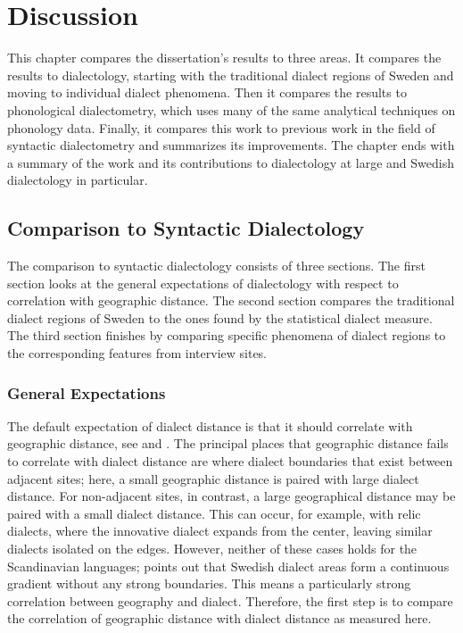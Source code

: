 \chapter{Discussion}
\label{discussion-chapter}

This chapter compares the dissertation's results to three areas. It
compares the results to dialectology, starting with the traditional
dialect regions of Sweden and moving to individual dialect phenomena. Then it
compares the results to phonological dialectometry, which uses many of
the same analytical techniques on phonology data. Finally, it compares
this work to previous work in the field of syntactic dialectometry and
summarizes its improvements. The chapter ends with a summary of the
work and its contributions to dialectology at large and Swedish
dialectology in particular.



\section{Comparison to Syntactic Dialectology}
\label{discussion-chapter-dialectology-section}

The comparison to syntactic dialectology consists of three
sections. The first section looks at the general expectations of
dialectology with respect to correlation with geographic distance. The
second section compares the traditional dialect regions of Sweden to
the ones found by the statistical dialect measure. The third section
finishes by comparing specific phenomena of dialect regions to the
corresponding features from interview sites.

\subsection{General Expectations}

The default expectation of dialect distance is that it should
correlate with geographic distance, see  and
. The principal places that geographic distance
fails to correlate with dialect distance are where dialect boundaries
that exist between adjacent sites; here, a small geographic distance
is paired with large dialect distance. For non-adjacent sites, in
contrast, a large geographical distance may be paired with a small
dialect distance. This can occur, for example, with relic dialects,
where the innovative dialect expands from the center, leaving similar
dialects isolated on the edges. However, neither of these cases holds
for the Scandinavian languages;  points out that
Swedish dialect areas form a continuous gradient without any strong
boundaries. This means a particularly strong correlation between
geography and dialect. Therefore, the first step is to compare the
correlation of geographic distance with dialect distance as measured
here.

